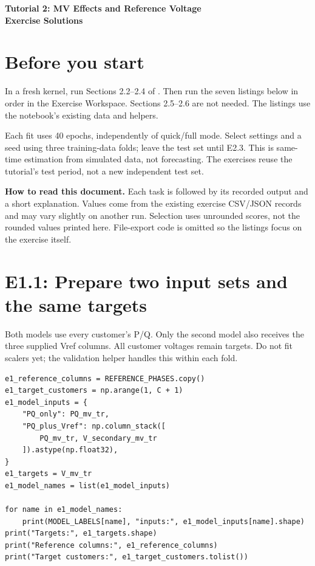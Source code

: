 \documentclass[11pt,a4paper]{article}
\begin{document}
\begin{center}
{\Large\bfseries Tutorial 2: MV Effects and Reference Voltage\\
Exercise Solutions}
\end{center}

\section*{Before you start}
In a fresh kernel, run Sections 2.2--2.4 of
.
Then run the seven listings below in order in the Exercise Workspace.
Sections 2.5--2.6 are not needed. The listings use the notebook's existing
data and helpers.

Each fit uses 40 epochs, independently of quick/full mode. Select settings
and a seed using three training-data folds; leave the test set until E2.3.
This is same-time estimation from simulated data, not forecasting.
The exercises reuse the tutorial's test period, not a new independent test set.

\textbf{How to read this document.} Each task is followed by its recorded
output and a short explanation. Values come from the existing exercise
CSV/JSON records and may vary slightly on another run. Selection uses
unrounded scores, not the rounded values printed here. File-export code
is omitted so the listings focus on the exercise itself.

\section*{E1.1: Prepare two input sets and the same targets}
Both models use every customer's P/Q. Only the second model also receives
the three supplied Vref columns. All customer voltages remain targets.
Do not fit scalers yet; the validation helper handles this within each fold.

\begin{lstlisting}
e1_reference_columns = REFERENCE_PHASES.copy()
e1_target_customers = np.arange(1, C + 1)
e1_model_inputs = {
    "PQ_only": PQ_mv_tr,
    "PQ_plus_Vref": np.column_stack([
        PQ_mv_tr, V_secondary_mv_tr
    ]).astype(np.float32),
}
e1_targets = V_mv_tr
e1_model_names = list(e1_model_inputs)

for name in e1_model_names:
    print(MODEL_LABELS[name], "inputs:", e1_model_inputs[name].shape)
print("Targets:", e1_targets.shape)
print("Reference columns:", e1_reference_columns)
print("Target customers:", e1_target_customers.tolist())
\end{lstlisting}
\end{document}
